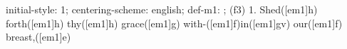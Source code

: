 initial-style: 1;
centering-scheme: english;
def-m1: \grealign;
(f3) 1. Shed([em1]h) forth([em1]h) thy([em1]h) grace([em1]g) with-([em1]f)in([em1]gv) our([em1]f) breast,([em1]e)